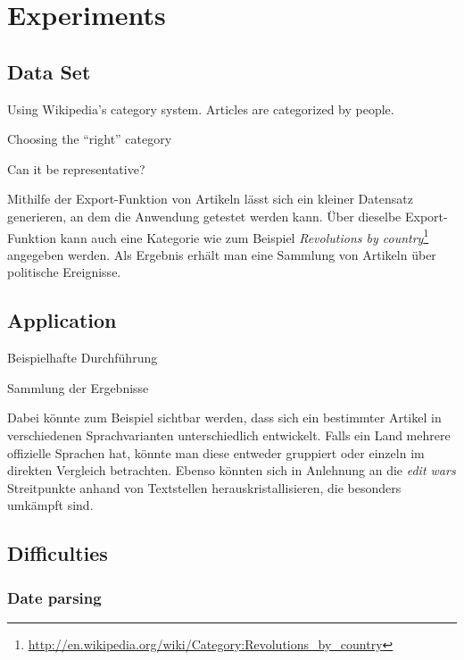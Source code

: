 \chapter{Experiments}\label{ch:experiment}

\section{Data Set}

Using Wikipedia's category system. 
Articles are categorized by people.

\begin{todos}
    \item Choosing the ``right'' category 
    \item Can it be representative?
\end{todos}

Mithilfe der Export-Funktion von Artikeln lässt sich ein kleiner Datensatz generieren, an dem die Anwendung getestet werden kann.
Über dieselbe Export-Funktion kann auch eine Kategorie wie zum Beispiel \emph{Revolutions by country}\footnote{\url{http://en.wikipedia.org/wiki/Category:Revolutions_by_country}} angegeben werden. 
Als Ergebnis erhält man eine Sammlung von Artikeln über politische Ereignisse.


\section{Application}

\begin{todos}
    \item Beispielhafte Durchführung
    \item Sammlung der Ergebnisse
\end{todos}

Dabei könnte zum Beispiel sichtbar werden, dass sich ein bestimmter Artikel in verschiedenen Sprachvarianten unterschiedlich entwickelt. 
Falls ein Land mehrere offizielle Sprachen hat, könnte man diese entweder gruppiert oder einzeln im direkten Vergleich betrachten.
Ebenso könnten sich in Anlehnung an die \emph{edit wars} Streitpunkte anhand von Textstellen herauskristallisieren, die besonders umkämpft sind. 

\section{Difficulties}

\subsection{Date parsing}

